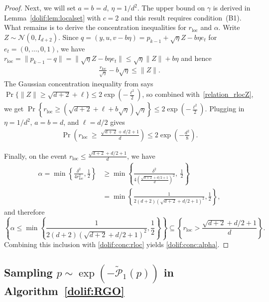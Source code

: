 \documentclass[11pt,letterpaper]{article}
\newcommand{\local}{\mathrm{loc}}
\newcommand{\brac}[1]{\left( #1\right)}
\begin{document}
\begin{proof}
Next, we will set $a=b=d$, $\eta=1/d^2$. The upper bound on $\gamma$ is derived in Lemma~\ref{dolif:lem:localset} with $c=2$ and this result requires condition~(B1). What remains is to derive the
concentration inequalities for $r_{\local}$ and $\alpha$.
Write $Z\sim \mathcal{N}(0,I_{d+2})$. Since $ q=(y,u,v-b\eta)= p_{k-1}+\sqrt{\eta} Z-b\eta e_t$ for $e_t=\brac{0,\ldots,0,1}$, we have $ r_{\local}=\| p_{k-1}- q\|=\|\sqrt{\eta} Z-b\eta e_t\|
  \le \sqrt{\eta} \|Z\|+b\eta$
and hence
\begin{align}
\label{relation_rlocZ}
  \frac{r_{\local}}{\sqrt{\eta}}-b\sqrt{\eta}\le \|Z\|.
\end{align}
The Gaussian concentration inequality from \cite[Equation (3.5)]{ledoux2013probability} says $ \Pr\{\|Z\|\ge \sqrt{d+2}+\ell\}\le 2\exp \left(-\frac{\ell^2}{2}\right)$, so combined with~\eqref{relation_rlocZ}, we get $ \Pr \left\{
    r_{\local}\ge (\sqrt{d+2}+\ell+b\sqrt{\eta})\sqrt{\eta}
  \right\}
  \le 2\exp \left(-\frac{\ell^2}{2}\right)$.  Plugging in $\eta=1/d^2$, $a=b=d$, and $\ell=d/2$ gives
\begin{align}
\label{dolif:conc:rloc}
    \Pr \left(
        r_{\local}\ \ge\ \frac{\sqrt{d+2}+d/2+1}{d}
    \right)
    \le 2\exp \left(-\frac{d^2}{8}\right).
\end{align}

Finally, on the event $ r_{\local}\le \frac{\sqrt{d+2}+d/2+1}{d}$, we have
\begin{align*}
  \alpha=\min\left\{\frac{\delta^2}{4r_{\local}^2},\frac{1}{2}\right\}
  &\ge
  \min\left\{
  \frac{\delta^2}{4\left(\frac{\sqrt{d+2}+d/2+1}{d}\right)^2},\ \frac{1}{2}
  \right\}\\
  &=\min\left\{\frac{1}{2(d+2)(\sqrt{d+2}+d/2+1)^2},\frac12\right\}, 
\end{align*}
and therefore
\[
  \left\{\alpha\le \min\left\{
  \frac{1}{2(d+2)(\sqrt{d+2}+d/2+1)^2},\frac12\right\}\right\}
  \subseteq
  \left\{r_{\local}> \frac{\sqrt{d+2}+d/2+1}{d}\right\}.
\]
Combining this inclusion with \eqref{dolif:conc:rloc} yields \eqref{dolif:conc:alpha}.
\end{proof}



\subsection{Sampling $ p\sim \exp\brac{-\widetilde{\mathcal{P}}_1( p)}$ in Algorithm~\ref{dolif:RGO}}
\label{dolif:appen:specialalgo}
\end{document}
